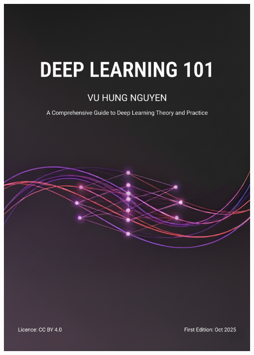 \documentclass[10pt,\papersize,twoside,openright]{book}
\theoremstyle{definition}
\theoremstyle{remark}
\begin{document}
{{{{{{            \includegraphics[width=\paperwidth,height=\paperheight]{images/DeepLearning101-cover-A6.png}%
          }{%
            }}}}}}
\end{document}
